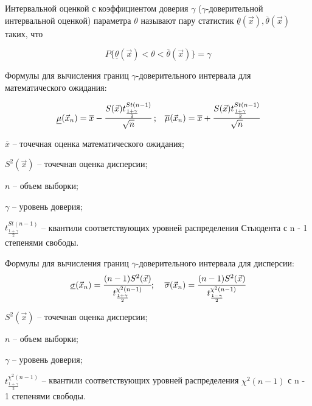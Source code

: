 Интервальной оценкой с коэффициентом доверия $\gamma$ ($\gamma$-доверительной интервальной оценкой) параметра $\theta$ называют пару статистик $\underline{\theta}(\vec x), \overline{\theta}(\vec x)$ таких, что

$$P\{\underline{\theta}(\vec x)< \theta< \overline{\theta}(\vec x)\}=\gamma$$ 

Формулы для вычисления границ $\gamma$-доверительного интервала для математического ожидания:

\begin{equation}
	\begin{array}{cc}
		\underline\mu(\vec x_n)=\overline x - \cfrac{S(\vec x)t^{St(n-1)}_{\frac{1+\gamma}{2}}}{\sqrt{n}}\; ; & \overline\mu(\vec x_n)=\overline x + \cfrac{S(\vec x)t^{St(n-1)}_{\frac{1+\gamma}{2}}}{\sqrt{n}}
	\end{array}
\end{equation}

$\overline x$ -- точечная оценка математического ожидания;

$S^2(\vec x)$ -- точечная оценка дисперсии;

$n$ -- объем выборки;

$\gamma$ -- уровень доверия;

$t^{St(n-1)}_{\frac{1+\gamma}{2}}$ -- квантили соответствующих уровней распределения Стьюдента с n - 1 степенями свободы.

Формулы для вычисления границ $\gamma$-доверительного интервала для дисперсии:
\begin{equation}
	\begin{array}{cc}
		\underline\sigma(\vec x_n)= \cfrac{(n-1)S^2(\vec x)}{t^{\chi^2(n-1)}_{\frac{1+\gamma}{2}}};\; & \overline\sigma(\vec x_n)= \cfrac{(n-1)S^2(\vec x)}{t^{\chi^2(n-1)}_{\frac{1-\gamma}{2}}}
	\end{array}
\end{equation}

$S^2(\vec x)$ -- точечная оценка дисперсии;

$n$ -- объем выборки;

$\gamma$ -- уровень доверия;

$t^{\chi^2(n-1)}_{\frac{1+\gamma}{2}}$ -- квантили соответствующих уровней распределения $\chi^2(n-1)$ с n - 1 степенями свободы.


